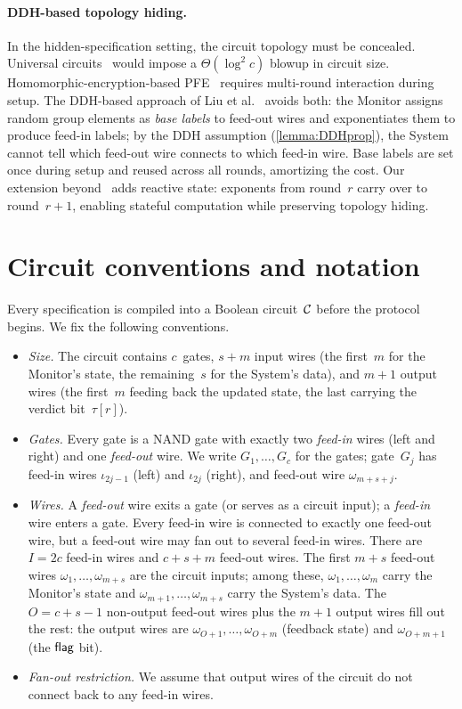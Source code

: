 \paragraph{DDH-based topology hiding.}
In the hidden-specification setting, the circuit topology must be concealed. Universal circuits~\cite{Val76} would impose a $\Theta(\log^2 c)$ blowup in circuit size. Homomorphic-encryption-based PFE~\cite{KM11} requires multi-round interaction during setup. The DDH-based approach of Liu et al.~\cite{LWY22} avoids both: the Monitor assigns random group elements as \emph{base labels} to feed-out wires and exponentiates them to produce feed-in labels; by the DDH assumption (\cref{lemma:DDHprop}), the System cannot tell which feed-out wire connects to which feed-in wire. Base labels are set once during setup and reused across all rounds, amortizing the cost. Our extension beyond~\cite{LWY22} adds reactive state: exponents from round~$r$ carry over to round~$r{+}1$, enabling stateful computation while preserving topology hiding.

\section{Circuit conventions and notation}\label{sec:conventions}

Every specification is compiled into a Boolean circuit~$\mathcal{C}$ before the protocol begins. We fix the following conventions.

\begin{itemize}
    \item \textit{Size.} The circuit contains $c$~gates, $s{+}m$ input wires (the first~$m$ for the Monitor's state, the remaining~$s$ for the System's data), and $m{+}1$ output wires (the first~$m$ feeding back the updated state, the last carrying the verdict bit~$\tau[r]$).
    \item \textit{Gates.} Every gate is a NAND gate with exactly two \emph{feed-in} wires (left and right) and one \emph{feed-out} wire. We write $G_1,\ldots,G_c$ for the gates; gate~$G_j$ has feed-in wires $\iota_{2j-1}$ (left) and $\iota_{2j}$ (right), and feed-out wire $\omega_{m+s+j}$.
    \item \textit{Wires.} A \emph{feed-out} wire exits a gate (or serves as a circuit input); a \emph{feed-in} wire enters a gate. Every feed-in wire is connected to exactly one feed-out wire, but a feed-out wire may fan out to several feed-in wires. There are $I = 2c$ feed-in wires and $c{+}s{+}m$ feed-out wires. The first $m{+}s$ feed-out wires $\omega_1,\ldots,\omega_{m+s}$ are the circuit inputs; among these, $\omega_1,\ldots,\omega_m$ carry the Monitor's state and $\omega_{m+1},\ldots,\omega_{m+s}$ carry the System's data. The $O = c{+}s{-}1$ non-output feed-out wires plus the $m{+}1$ output wires fill out the rest: the output wires are $\omega_{O+1},\ldots,\omega_{O+m}$ (feedback state) and $\omega_{O+m+1}$ (the $\textsf{flag}$ bit).
    \item \textit{Fan-out restriction.} We assume that output wires of the circuit do not connect back to any feed-in wires.
\end{itemize}

